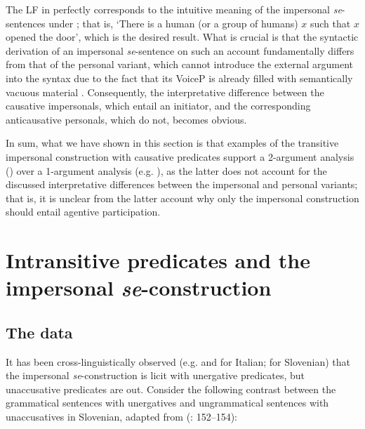 \documentclass[output=paper,
modfonts,nonflat,
newtxmath
]{langsci/langscibook}
\begin{document}
\noindent The LF in  perfectly corresponds to the intuitive meaning of the impersonal \textit{se}-sentences under ; that is, `There is a human (or a group of humans) $x$ such that $x$ opened the door', which is the desired result. What is crucial is that the syntactic derivation of an impersonal \textit{se}-sentence on such an account fundamentally differs from that of the personal variant, which cannot introduce the external argument into the syntax due to the fact that its VoiceP  is already filled with semantically vacuous material . Consequently, the interpretative difference between the causative impersonals, which entail an initiator, and the corresponding anticausative personals, which do not, becomes obvious. \par 

In sum, what we have shown in this section is that examples of the transitive impersonal construction with causative predicates support a 2-argument analysis (\citealt{riverosheppard2003}) over a 1-argument analysis (e.g. \citealt{marelj2004,grahek2008}), as the latter does not account for the discussed interpretative differences between the impersonal and personal variants; that is, it is unclear from the latter account why only the impersonal construction should entail agentive participation.

\section{Intransitive predicates and the impersonal \textit{se}-construction} \label{sec3}

\subsection{The data}

It has been cross-linguistically observed (e.g. \citealt{cinque1995} and \citealt{dalessandro2008} for Italian; \citealt{ilcmarvin2016} for Slovenian) that the impersonal \textit{se}-construction is licit with unergative predicates, but unaccusative predicates are out. Consider the following contrast between the grammatical sentences with unergatives  and ungrammatical sentences with unaccusatives  in Slovenian, adapted from \citeauthor{ilcmarvin2016} (\citeyear{ilcmarvin2016}: 152–154):
\end{document}
